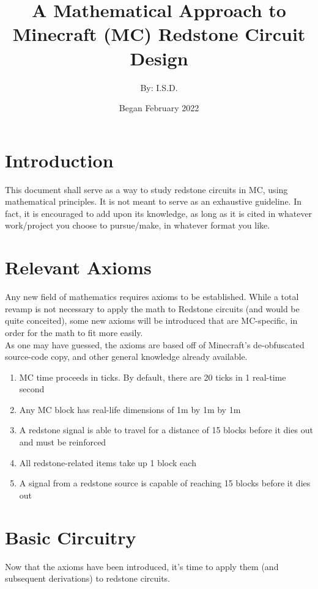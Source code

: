 \documentclass{article}
\title{A Mathematical Approach to Minecraft (MC) Redstone Circuit Design}
\author{By: I.S.D.}
\date{Began February 2022}
\begin{document}
\maketitle

\section{Introduction}

This document shall serve as a way to study redstone circuits in MC, using mathematical principles. It is not meant to serve as an exhaustive guideline. In fact, it is encouraged to add upon its knowledge, as long as it is cited in whatever work/project you choose to pursue/make, in whatever format you like.

\section{Relevant Axioms}
Any new field of mathematics requires axioms to be established. While a total revamp is not necessary to apply the math to Redstone circuits (and would be quite conceited), some new axioms will be introduced that are MC-specific, in order for the math to fit more easily. \\

\noindent
As one may have guessed, the axioms are based off of Minecraft's de-obfuscated source-code copy, and other general knowledge already available.

\begin{enumerate}
\item MC time proceeds in ticks. By default, there are 20 ticks in 1 real-time second
\item Any MC block has real-life dimensions of 1m by 1m by 1m
\item A redstone signal is able to travel for a distance of 15 blocks before it dies out and must be reinforced
\item All redstone-related items take up 1 block each
\item A signal from a redstone source is capable of reaching 15 blocks before it dies out
\end{enumerate}

\section{Basic Circuitry}
Now that the axioms have been introduced, it's time to apply them (and subsequent derivations) to redstone circuits. \\
\end{document}
